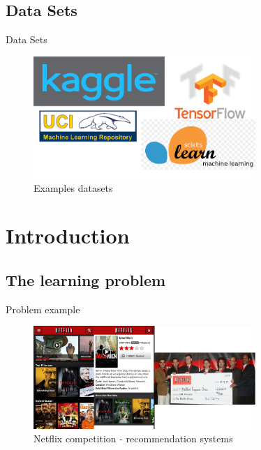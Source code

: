 \documentclass{beamer}
\begin{document}
\subsection{Data Sets}
\begin{frame}{Data Sets}
\begin{figure}
  \centering
    \includegraphics[width=0.75\textwidth]{datasets}
  		\caption{ Examples datasets }
    \label{books}
 \end{figure}
\end{frame}

\section{Introduction}
\subsection{The learning problem}
\begin{frame}{Problem example}
\begin{figure}
  \centering
    \includegraphics[width=0.75\textwidth]{netflixcomp}
  		\caption{ Netflix competition - recommendation systems }
    \label{netflix competition}
 \end{figure}
\end{frame}
\end{document}
